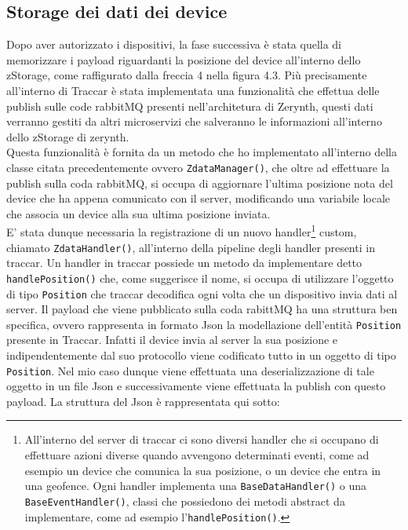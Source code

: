 \documentclass[a4paper,titlepage,12pt]{book}
\begin{document}
{\subsection{
Storage dei dati dei device}
Dopo aver autorizzato i dispositivi, la fase successiva è stata quella di memorizzare i payload riguardanti la posizione del device all'interno dello zStorage, come raffigurato dalla freccia 4 nella figura 4.3. Più precisamente all'interno di Traccar è stata implementata una funzionalità che effettua delle publish sulle code rabbitMQ presenti nell'architetura di Zerynth, questi dati verranno gestiti da altri microservizi che salveranno le informazioni all'interno dello zStorage di zerynth.\\
Questa funzionalità è fornita da un metodo che ho implementato all'interno della classe citata precedentemente ovvero \texttt{ZdataManager()}, che oltre ad effettuare la publish sulla coda rabbitMQ, si occupa di aggiornare l'ultima posizione nota del device che ha appena comunicato con il server, modificando una variabile locale che associa un device alla sua ultima posizione inviata.\\
E' stata dunque necessaria la registrazione di un nuovo handler\footnote{
All'interno del server di traccar ci sono diversi handler che si occupano di effettuare azioni diverse quando avvengono determinati eventi, come ad esempio un device che comunica la sua posizione, o un device che entra in una geofence. Ogni handler implementa una \texttt{BaseDataHandler()} o una \texttt{BaseEventHandler()}, classi che possiedono dei metodi abstract da implementare, come ad esempio l'\texttt{handlePosition()}.} custom, chiamato \texttt{ZdataHandler()}, all'interno della pipeline degli handler presenti in traccar. Un handler in traccar possiede un metodo da implementare detto \texttt{handlePosition()} che, come suggerisce il nome, si occupa di utilizzare l'oggetto di tipo \texttt{Position} che traccar decodifica ogni volta che un dispositivo invia dati al server.
Il payload che viene pubblicato sulla coda rabittMQ ha una struttura ben specifica, ovvero rappresenta in formato Json la modellazione dell'entità \texttt{Position} presente in Traccar. Infatti il device invia al server la sua posizione e indipendentemente dal suo protocollo viene codificato tutto in un oggetto di tipo \texttt{Position}. Nel mio caso dunque viene effettuata una deserializzazione di tale oggetto in un file Json e successivamente viene effettuata la publish con questo payload. La struttura del Json è rappresentata qui sotto:

}
\end{document}
